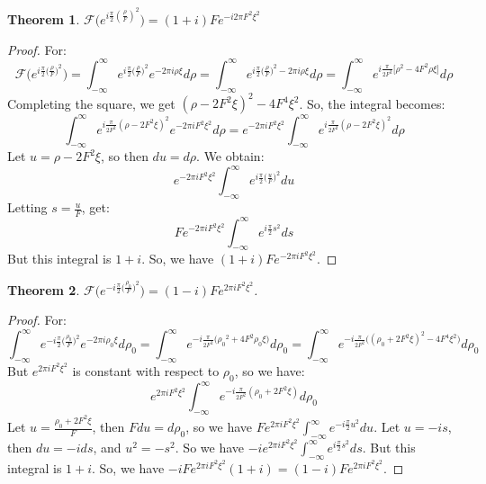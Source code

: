 \documentclass[oneside]{book}
\theoremstyle{mystyle}
\newtheorem{theorem}{Theorem}[section]
\begin{document}
\begin{theorem}
$\mathcal{F}\big(e^{i\frac{\pi}{2}(\frac{\rho}{F})^2}\big) = (1+i)Fe^{-i2\pi F^2 \xi^2}$
\end{theorem}
\begin{proof}
For:
\begin{equation*}
    \mathcal{F}\big(e^{i\frac{\pi}{2} \big(\frac{\rho}{F}\big)^2}\big) = \int_{-\infty}^{\infty} e^{i\frac{\pi}{2}\big(\frac{\rho}{F}\big)^2}e^{-2\pi i \rho \xi}d\rho = \int_{-\infty}^{\infty} e^{i\frac{\pi}{2}\big(\frac{\rho}{F}\big)^2-2\pi i \rho \xi}d\rho = \int_{-\infty}^{\infty} e^{i\frac{\pi}{2F^2}\big[\rho^2-4F^2\rho \xi\big]}d\rho    
\end{equation*}
Completing the square, we get $(\rho - 2F^2 \xi)^2 - 4F^4\xi^2$. So, the integral becomes:
\begin{equation*}
    \int_{-\infty}^{\infty} e^{i\frac{\pi}{2F^2}(\rho - 2F^2\xi)^2}e^{-2\pi i F^2 \xi^2}d\rho = e^{-2\pi i F^2 \xi^2}\int_{-\infty}^{\infty} e^{i\frac{\pi}{2F^2}(\rho - 2F^2\xi)^2}d\rho
\end{equation*}
Let $u = \rho - 2F^2\xi$, so then $du = d\rho$. We obtain:
\begin{equation*}
    e^{-2\pi i F^2 \xi^2}\int_{-\infty}^{\infty} e^{i\frac{\pi}{2}\big(\frac{u}{F}\big)^2}du
\end{equation*}
Letting $s = \frac{u}{F}$, get:
\begin{equation*}
Fe^{-2\pi i F^2 \xi^2} \int_{-\infty}^{\infty} e^{i\frac{\pi}{2}s^2}ds
\end{equation*}
But this integral is $1+i$. So, we have $(1+i)Fe^{-2\pi i F^2 \xi^2}$.
\end{proof}
\begin{theorem}
$\mathcal{F}(e^{-i\frac{\pi}{2}\big(\frac{\rho_0}{F}\big)^2}\big) = (1-i)Fe^{2\pi i F^2 \xi^2}$.
\end{theorem}
\begin{proof}
For:
\begin{equation*}
    \int_{-\infty}^{\infty} e^{-i\frac{\pi}{2}\big(\frac{\rho_0}{F}\big)^2}e^{-2\pi i \rho_0 \xi}d\rho_0 = \int_{-\infty}^{\infty} e^{-i\frac{\pi}{2F^2}\big({\rho_0}^2 + 4F^2 \rho_0 \xi\big)}d\rho_0 = \int_{-\infty}^{\infty} e^{-i\frac{\pi}{2F^2}\big((\rho_0+2F^2\xi)^2 - 4F^4\xi^2\big)}d\rho_0
\end{equation*}
But $e^{2\pi i F^2 \xi^2}$ is constant with respect to $\rho_0$, so we have:
\begin{equation*}
    e^{2\pi i F^2 \xi^2} \int_{-\infty}^{\infty} e^{-i\frac{\pi}{2F^2}(\rho_0+2F^2\xi)}d\rho_0    
\end{equation*}
Let $u = \frac{\rho_0 + 2F^2 \xi}{F}$, then $Fdu = d\rho_0$, so we have $Fe^{2\pi i F^2 \xi^2} \int_{-\infty}^{\infty} e^{-i\frac{\pi}{2}u^2}du$. Let $u = -is$, then $du = -ids$, and $u^2 = -s^2$. So we have $-i e^{2\pi i F^2 \xi^2}\int_{-\infty}^{\infty} e^{i\frac{\pi}{2}s^2}ds$. But this integral is $1+i$. So, we have $-iFe^{2\pi i F^2 \xi^2}(1+i) = (1-i)Fe^{2\pi i F^2 \xi^2}$.
\end{proof} 
\end{document}
